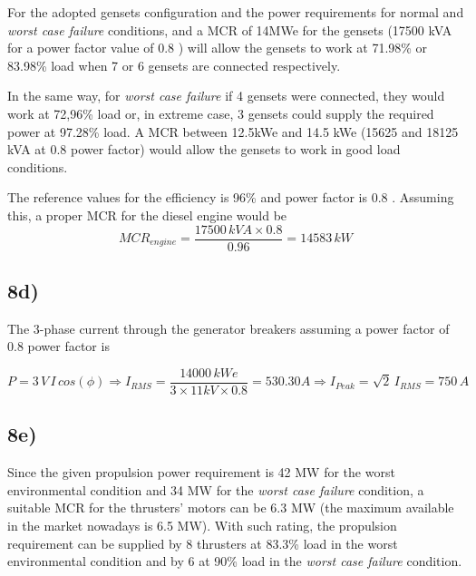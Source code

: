 For the adopted gensets configuration and the power requirements for normal and \textit{worst case failure} conditions, and a MCR of 14MWe for the gensets (17500 kVA for a power factor value of 0.8 \cite{CatGenerators}) will allow the gensets to work at 71.98\% or 83.98\% load when 7 or 6 gensets are connected respectively. 

In the same way, for \textit{worst case failure} if 4 gensets were connected, they would work at 72,96\% load or, in extreme case, 3 gensets could supply the required power at 97.28\% load. A MCR between 12.5kWe and 14.5 kWe (15625 and 18125 kVA at 0.8 power factor) would allow the gensets to work in good load conditions. 

The reference values for the efficiency is 96\% and power factor is 0.8 \cite{CatGenerators}. Assuming this, a proper MCR for the diesel engine would be
\[
MCR_{engine}=\frac{17500 \, kV\!A \times 0.8}{0.96}=14583 \, kW
\]


\subsection*{8d)}


The 3-phase current through the generator breakers assuming a power factor of 0.8 power factor is

\[
P=3\,V\,I\,cos(\phi) \Rightarrow I_{RMS}=\frac{14000 \, kW\!e}{3 \times 11 kV \times 0.8}=530.30 A \Rightarrow I_{Peak}=\sqrt{2}\,I_{RMS}=750\,A
\]

\subsection*{8e)}


Since the given propulsion power requirement is 42 MW for the worst environmental condition and 34 MW for the \textit{worst case failure} condition, a suitable MCR for the thrusters' motors can be 6.3 MW (the maximum available in the market nowadays is 6.5 MW). With such rating, the propulsion requirement can be supplied by 8 thrusters at 83.3\% load in the worst environmental condition and by 6 at 90\% load in the \textit{worst case failure} condition. 

